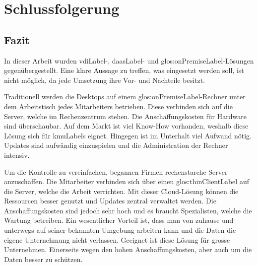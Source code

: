 \chapter{Schlussfolgerung}




\section{Fazit}
In dieser Arbeit wurden \Gls{vdiLabel}-, \Gls{daasLabel}- und \gls{glos:onPremiseLabel}-Lösungen gegenübergestellt. Eine klare Aussage zu treffen, was eingesetzt werden soll, ist nicht möglich, da jede Umsetzung ihre Vor- und Nachteile besitzt.

Traditionell werden die Desktops auf einem \gls{glos:onPremiseLabel}-Rechner unter dem Arbeitstisch jedes Mitarbeiters betrieben. Diese verbinden sich auf die Server, welche im Rechenzentrum stehen.
Die Anschaffungskosten für Hardware sind überschaubar.
Auf dem Markt ist viel Know-How vorhanden, weshalb diese Lösung sich für \Glspl{kmuLabel} eignet.
Hingegen ist im Unterhalt viel Aufwand nötig. Updates sind aufwändig einzuspielen und die Administration der Rechner intensiv.

Um die Kontrolle zu vereinfachen, begannen Firmen rechenstarche Server anzuschaffen.
Die Mitarbeiter verbinden sich über einen \Gls{glos:thinClientLabel} auf die Server, welche die Arbeit verrichten. Mit dieser Cloud-Lösung können die Ressourcen besser genutzt und Updates zentral verwaltet werden. Die Anschaffungskosten sind jedoch sehr hoch und es braucht Spezialisten, welche die Wartung betreiben.
Ein wesentlicher Vorteil ist, dass man von zuhause und unterwegs auf seiner bekannten Umgebung arbeiten kann und die Daten die eigene Unternehmung nicht verlassen.
Geeignet ist diese Lösung für grosse Unternehmen. Einerseits wegen den hohen Anschaffungskosten, aber auch um die Daten besser zu schützen.

